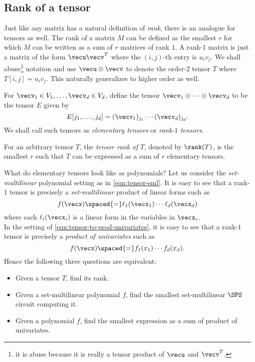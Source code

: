 \subsection{Rank of a tensor}

Just like any matrix has a natural definition of \emph{rank}, there is an analogue for tensors as well.
The rank of a matrix $M$ can be defined as the smallest $r$ for which $M$ can be written as a sum of $r$ matrices of rank $1$.
A rank-$1$ matrix is just a matrix of the form $\vecu \vecv^T$ where the $(i,j)$-th entry is $u_iv_j$.
We shall abuse\footnote{it is abuse because it is really a tensor product of $\vecu$ and $\vecv^T$.}
notation and use $\vecu \otimes \vecv$ to denote the order-$2$ tensor $T$ where $T[i,j] = u_i v_j$.
This naturally generalizes to higher order as well.

\begin{definition}
  For $\vecv_1\in V_1, \ldots, \vecv_d \in V_d$, define the tensor $\vecv_1 \otimes \cdots \otimes \vecv_d$ to be the tensor $E$ given by
\[
E[j_1,\ldots, j_d] = (\vecv_1)_{j_1} \cdots (\vecv_d)_{j_d}.
\]
We shall call such tensors as \emph{elementary tensors} or \emph{rank-$1$ tensors}. 

For an arbitrary tensor $T$, the \emph{tensor rank of $T$}, denoted by $\rank(T)$, is the smallest $r$ such that $T$ can be expressed as a sum of $r$ elementary tensors. 
\end{definition}

\noindent 
What do elementary tensors look like as polynomials?
Let us consider the \emph{set-multilinear} polynomial setting as in \eqref{eqn:tensor-sml}.
It is easy to see that a rank-$1$ tensor is precisely a \emph{set-multilinear} product of linear forms such as
\[
f(\vecx) \spaced{=} \ell_1(\vecx_1) \cdots \ell_d(\vecx_d)
\]
where each $\ell_i(\vecx_i)$ is a linear form in the variables in $\vecx_i$. \\

In the setting of \eqref{eqn:tensor-to-prod-univariates}, it is easy to see that a rank-$1$ tensor is precisely a \emph{product of univariates} such as
\[
f(\vecx) \spaced{=} f_1(x_1)\cdots f_d(x_d).
\]
\noindent
Hence the following three questions are equivalent:
\begin{itemize}
\setlength\itemsep{0em}
\item Given a tensor $T$, find its rank. 
\item Given a set-multilinear polynomial $f$, find the smallest set-multilinear $\SPS$ circuit computing it. 
\item Given a polynomial $f$, find the smallest expression as a sum of product of univariates.
\end{itemize}

